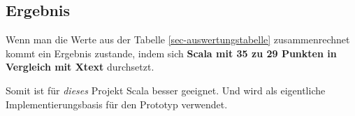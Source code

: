 \subsection{Ergebnis}

Wenn man die Werte aus der Tabelle \ref{sec-auswertungstabelle} zusammenrechnet
kommt ein Ergebnis zustande, indem sich \textbf{Scala mit 35 zu
29 Punkten in Vergleich mit Xtext} durchsetzt.

Somit ist für \emph{dieses} Projekt Scala besser geeignet.
Und wird als eigentliche Implementierungsbasis für den Prototyp verwendet.

